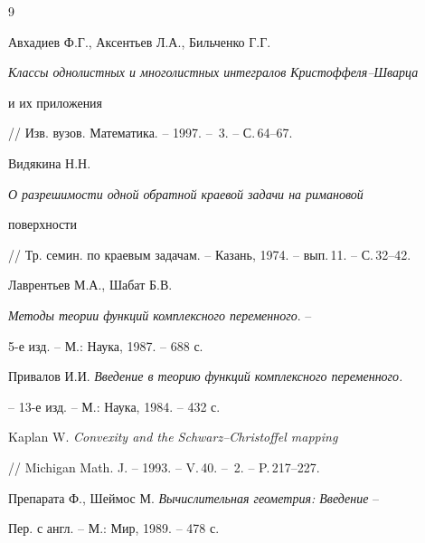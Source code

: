 \begin{thebibliography}{9} 


 




Авхадиев Ф.Г., Аксентьев Л.А., Бильченко Г.Г.


{\em Классы однолистных и многолистных интегралов Крис\-тоф\-фе\-ля--Швар\-ца


и их приложения}


// Изв. вузов. Математика. -- 1997. -- \No\,3. -- С.\,64--67.







Видякина Н.Н. {\em О разрешимости одной обратной краевой задачи на римановой


поверхности}


// Тр. семин. по краевым задачам. -- Казань, 1974. -- вып.\,11. -- С.\,32--42.







Лаврентьев М.А., Шабат Б.В.


{\em Методы теории функций комплексного переменного}. --


5-е изд. -- М.: Наука, 1987. -- 688 с.







Привалов И.И. {\em Введение в теорию функций комплексного пе\-ре\-мен\-но\-го.}


-- 13-е изд. -- М.: Наука, 1984. -- 432 с.







Kaplan W. {\em Convexity and the Schwarz--Christoffel mapping}


// Michigan Math. J. -- 1993. -- V.\,40. -- \No\,2. -- P.\,217--227.







Препарата Ф., Шеймос М. {\em Вычислительная геометрия: Введение} -- 


Пер. с англ. -- М.: Мир, 1989. -- 478 с.





\end{thebibliography} 


 


\vskip 2cm 


 






 


 


